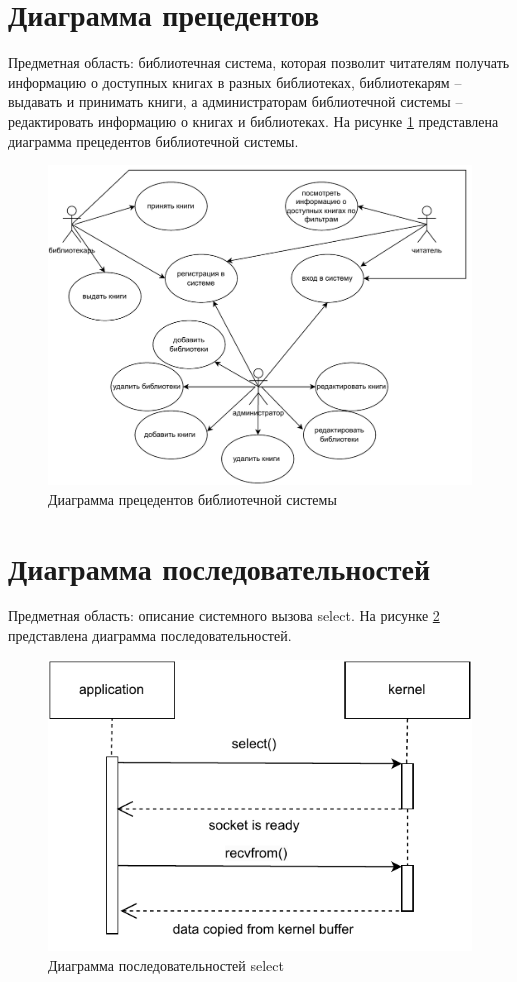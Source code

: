 \documentclass[12pt]{report}
\begin{document}
\section{Диаграмма прецедентов}
Предметная область: библиотечная система, которая позволит читателям получать информацию о доступных книгах в разных библиотеках, библиотекарям -- выдавать и принимать книги, а администраторам библиотечной системы -- редактировать информацию о книгах и библиотеках. 
На рисунке \ref{fig:uc} представлена диаграмма прецедентов библиотечной системы. 
\newpage
\begin{figure}[h]
  \centering
  \includegraphics[scale=0.7]{uc.pdf}
  \caption{Диаграмма прецедентов библиотечной системы}
  \label{fig:uc}
\end{figure}

\section{Диаграмма последовательностей}

Предметная область: описание системного вызова select.
На рисунке \ref{fig:mc} представлена диаграмма последовательностей.

\begin{figure}[h]
  \centering
  \includegraphics[scale = 0.9]{ds.pdf}
  \caption{Диаграмма последовательностей select}
  \label{fig:mc}
\end{figure}
\end{document}

